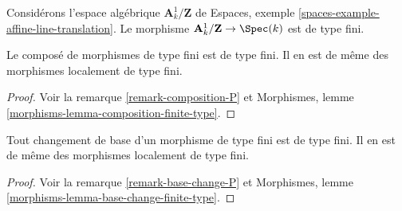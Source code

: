 \noindent
Considérons l'espace algébrique $\mathbf{A}^1_k/\mathbf{Z}$ de
Espaces, exemple \ref{spaces-example-affine-line-translation}.
Le morphisme $\mathbf{A}^1_k/\mathbf{Z} \to \Spec(k)$
est de type fini.

\begin{lemma}
\label{lemma-composition-finite-type}
Le composé de morphismes de type fini est de type fini.
Il en est de même des morphismes localement de type fini.
\end{lemma}

\begin{proof}
Voir la remarque \ref{remark-composition-P} et
Morphismes, lemme \ref{morphisms-lemma-composition-finite-type}.
\end{proof}

\begin{lemma}
\label{lemma-base-change-finite-type}
Tout changement de base d'un morphisme de type fini est de type fini.
Il en est de même des morphismes localement de type fini.
\end{lemma}

\begin{proof}
Voir la remarque \ref{remark-base-change-P} et
Morphismes, lemme \ref{morphisms-lemma-base-change-finite-type}.
\end{proof}

